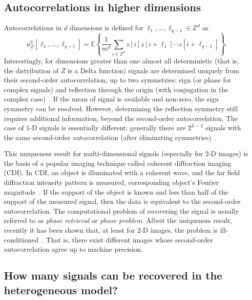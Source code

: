 \documentclass[12pt]{article}
\newcommand{\E}{\mathbb{E}}
\newcommand{\1}{\mathbf{1}}
\theoremstyle{plain}
\theoremstyle{definition}
\theoremstyle{remark}
\theoremstyle{plain}
\theoremstyle{remark}
\theoremstyle{plain}
\theoremstyle{plain}
\theoremstyle{plain}
\numberwithin{equation}{section}
\begin{document}
\subsection{Autocorrelations in higher dimensions} \label{sec:high_dimensions}

Autocorrelations in $d$ dimensions is defined for  $\ell_1,\ldots,\ell_{q-1}\in\mathbb{Z}^d$  as 
\begin{equation}
a_Z^q[\ell_1,\ldots,\ell_{q-1}]   = \E\left\{\frac{1}{m^d} \sum_{i\in\mathbb{Z}^d} z[i]z[i+\ell_1]\cdots z[i+\ell_{q-1}]\right\}.
\label{eq:ac_d_dimension}
\end{equation}
Interestingly, for dimensions greater than one almost all deterministic (that is, the distribution of $Z$ is a Delta function) signals are determined uniquely from their second-order autocorrelation, up to two symmetries: sign (or phase for complex signals) and reflection through the origin (with conjugation in the complex case)~\cite{hayes1982reconstruction}. 
If the mean of signal is available and non-zero, the sign symmetry can be resolved. However, determining the reflection symmetry still requires additional information, beyond the second-order autocorrelation.
The case of 1-D signals is essentially different: generally there are $2^{L-2}$ signals with the same second-order autocorrelation (after eliminating  symmetries)~\cite{beinert2015ambiguities,bendory2017fourier}. 


This uniqueness result for multi-dimensional signals (especially for 2-D images) is the basis of a popular imaging technique called coherent diffraction imaging (CDI). In CDI, an object is
illuminated with a coherent wave, and the far field diffraction
intensity pattern  is measured, corresponding object's Fourier magnitude~\cite{miao1999extending,shechtman2015phase}. 
If the support of the object is known and less than half of the support of the measured signal, then the data is equivalent to the second-order autocorrelation. The computational problem of recovering the signal is usually referred to as \emph{phase retrieval} or \emph{phase problem}.
Albeit the uniqueness result, recently it has been shown that, at least for 2-D images, the problem is  ill-conditioned~\cite{barnett2018geometry}. That is, there exist different images whose second-order autocorrelation agree up to machine precision. 

\subsection{How many signals can be recovered in the heterogeneous model?}
\label{sec:heterogeneity}
\end{document}
